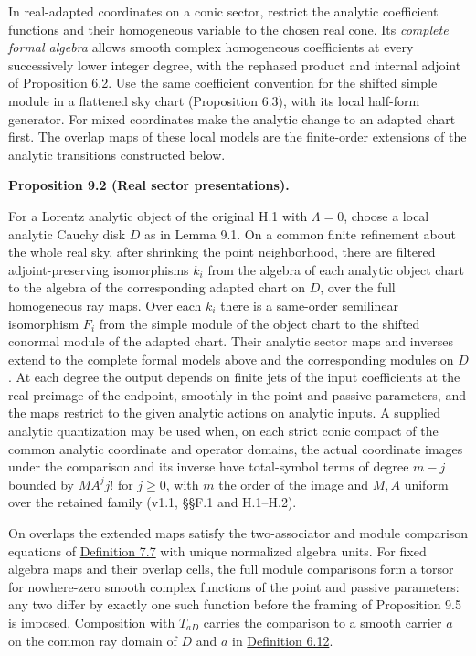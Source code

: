 \documentclass[
  english,
  11pt,
  reqno]{amsart}
\makeatletter
\newcommand{\pandocstatementheading}[1]{%
  \par\if@nobreak\else
    \addpenalty{\@beginparpenalty}%
    \addvspace{.5\baselineskip plus .2\baselineskip minus .2\baselineskip}%
  \fi
  {\normalfont\bfseries #1\par}%
  \nobreak\@afterindenttrue\@afterheading
}
\makeatother
\begin{document}
In real-adapted coordinates on a conic sector, restrict the analytic
coefficient functions and their homogeneous variable to the chosen real
cone. Its \emph{complete formal algebra} allows smooth complex
homogeneous coefficients at every successively lower integer degree,
with the rephased product and internal adjoint of Proposition 6.2. Use
the same coefficient convention for the shifted simple module in a
flattened sky chart (Proposition 6.3), with its local half-form
generator. For mixed coordinates make the analytic change to an adapted
chart first. The overlap maps of these local models are the finite-order
extensions of the analytic transitions constructed below.

\pandocstatementheading{\leavevmode{}\label{prop:analytic-real-sector-interface}Proposition 9.2 (Real sector presentations).}

For a Lorentz analytic object of the original H.1 with \(\Lambda=0\),
choose a local analytic Cauchy disk \(D\) as in Lemma 9.1. On a common
finite refinement about the whole real sky, after shrinking the point
neighborhood, there are filtered adjoint-preserving isomorphisms \(k_i\)
from the algebra of each analytic object chart to the algebra of the
corresponding adapted chart on \(D\), over the full homogeneous ray
maps. Over each \(k_i\) there is a same-order semilinear isomorphism
\(F_i\) from the simple module of the object chart to the shifted
conormal module of the adapted chart. Their analytic sector maps and
inverses extend to the complete formal models above and the
corresponding modules on \(D\). At each degree the output depends on
finite jets of the input coefficients at the real preimage of the
endpoint, smoothly in the point and passive parameters, and the maps
restrict to the given analytic actions on analytic inputs. A supplied
analytic quantization may be used when, on each strict conic compact of
the common analytic coordinate and operator domains, the actual
coordinate images under the comparison and its inverse have total-symbol
terms of degree \(m-j\) bounded by \(M A^j j!\) for \(j\ge0\), with
\(m\) the order of the image and \(M,A\) uniform over the retained
family (v1.1, §§F.1 and H.1--H.2).

On overlaps the extended maps satisfy the two-associator and module
comparison equations of
\hyperref[def:online-complete-independent-wave-source]{Definition 7.7}
with unique normalized algebra units. For fixed algebra maps and their
overlap cells, the full module comparisons form a torsor for
nowhere-zero smooth complex functions of the point and passive
parameters: any two differ by exactly one such function before the
framing of Proposition 9.5 is imposed. Composition with \(T_{aD}\)
carries the comparison to a smooth carrier \(a\) on the common ray
domain of \(D\) and \(a\) in
\hyperref[def:online-wave-carrier-displays]{Definition 6.12}.
\end{document}
